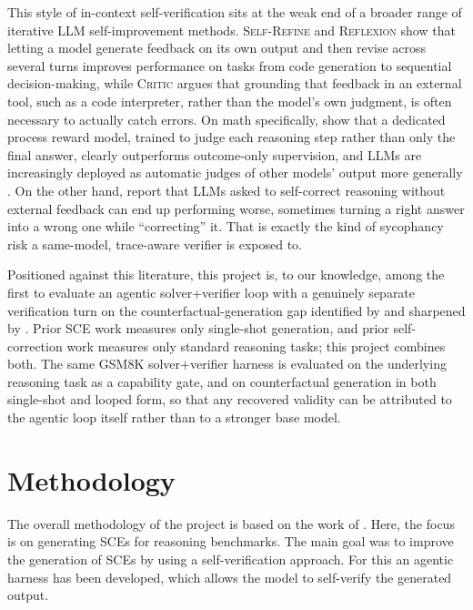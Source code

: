 \documentclass[twoside,twocolumn,10pt]{article}
\begin{document}
This style of in-context self-verification sits at the weak end of a broader range of iterative LLM self-improvement methods. \textsc{Self-Refine} \cite{madaan2023selfrefine} and \textsc{Reflexion} \cite{shinn2023reflexion} show that letting a model generate feedback on its own output and then revise across several turns improves performance on tasks from code generation to sequential decision-making, while \textsc{Critic} \cite{gou2023critic} argues that grounding that feedback in an external tool, such as a code interpreter, rather than the model's own judgment, is often necessary to actually catch errors. On math specifically, \textcite{lightman2023letsverify} show that a dedicated process reward model, trained to judge each reasoning step rather than only the final answer, clearly outperforms outcome-only supervision, and LLMs are increasingly deployed as automatic judges of other models' output more generally \cite{zheng2023judging}. On the other hand, \textcite{huang2023llmscannotselfcorrect} report that LLMs asked to self-correct reasoning without external feedback can end up performing worse, sometimes turning a right answer into a wrong one while ``correcting'' it. That is exactly the kind of sycophancy risk a same-model, trace-aware verifier is exposed to.

Positioned against this literature, this project is, to our knowledge, among the first to evaluate an agentic solver+verifier loop with a genuinely separate verification turn on the counterfactual-generation gap identified by \textcite{dehghanighobadi2025llmsexplaincounterfactually} and sharpened by \textcite{mayne2025llmsdontknowdecision}. Prior SCE work measures only single-shot generation, and prior self-correction work measures only standard reasoning tasks; this project combines both. The same GSM8K solver+verifier harness is evaluated on the underlying reasoning task as a capability gate, and on counterfactual generation in both single-shot and looped form, so that any recovered validity can be attributed to the agentic loop itself rather than to a stronger base model.


\section{Methodology}
\label{sec:methodology}
\fontsize{11}{13}\selectfont
The overall methodology of the project is based on the work of \textcite{dehghanighobadi2025llmsexplaincounterfactually}. Here, the focus is on generating SCEs for reasoning benchmarks. The main goal was to improve the generation of SCEs by using a self-verification approach. For this an agentic harness has been developed, which allows the model to self-verify the generated output.
\end{document}
